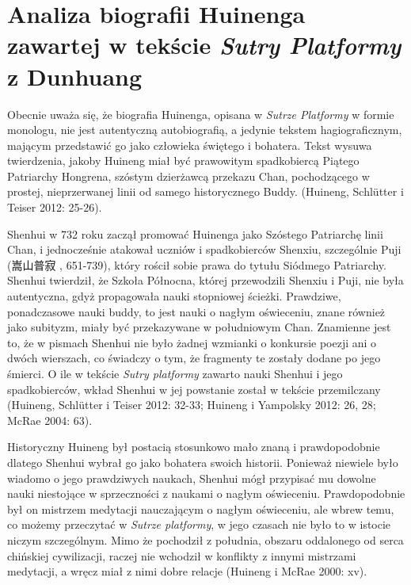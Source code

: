 \fi

\section{Analiza biografii Huinenga zawartej w tekście \textit{Sutry Platformy} z Dunhuang}
Obecnie uważa się, że biografia Huinenga, opisana w \textit{Sutrze Platformy} w formie monologu, nie jest autentyczną autobiografią, a jedynie tekstem hagiograficznym, mającym przedstawić go jako człowieka świętego i bohatera. Tekst wysuwa twierdzenia, jakoby Huineng miał być prawowitym spadkobiercą Piątego Patriarchy Hongrena, szóstym dzierżawcą przekazu Chan, pochodzącego w prostej, nieprzerwanej linii od samego historycznego Buddy. (Huineng, Schlütter i Teiser 2012: 25-26). %

Shenhui w 732 roku zaczął promować Huinenga jako Szóstego Patriarchę linii Chan, i jednocześnie atakował uczniów i spadkobierców Shenxiu, szczególnie Puji (嵩山普寂 , 651-739), który rościł sobie prawa do tytułu Siódmego Patriarchy. Shenhui twierdził, że Szkoła Północna, której przewodzili Shenxiu i Puji, nie była autentyczna, gdyż propagowała nauki stopniowej ścieżki. Prawdziwe, ponadczasowe nauki buddy, to jest nauki o nagłym oświeceniu, znane również jako subityzm, miały być przekazywane w południowym Chan. Znamienne jest to, że w pismach Shenhui nie było żadnej wzmianki o konkursie poezji ani o dwóch wierszach, co świadczy o tym, że fragmenty te zostały dodane po jego śmierci. O ile w tekście \textit{Sutry platformy} zawarto nauki Shenhui i jego spadkobierców, wkład Shenhui w jej powstanie został w tekście przemilczany (Huineng, Schlütter i Teiser 2012: 32-33; Huineng i Yampolsky 2012: 26, 28; McRae 2004: 63).

Historyczny Huineng był postacią stosunkowo mało znaną i prawdopodobnie dlatego Shenhui wybrał go jako bohatera swoich historii. Ponieważ niewiele było wiadomo o jego prawdziwych naukach, Shenhui mógł przypisać mu dowolne nauki niestojące w sprzeczności z naukami o nagłym oświeceniu. Prawdopodobnie był on mistrzem medytacji nauczającym o nagłym oświeceniu, ale wbrew temu, co możemy przeczytać w \textit{Sutrze platformy}, w jego czasach nie było to w istocie niczym szczególnym. Mimo że pochodził z południa, obszaru oddalonego od serca chińskiej cywilizacji, raczej nie wchodził w konflikty z innymi mistrzami medytacji, a wręcz miał z nimi dobre relacje (Huineng i McRae 2000: xv).

